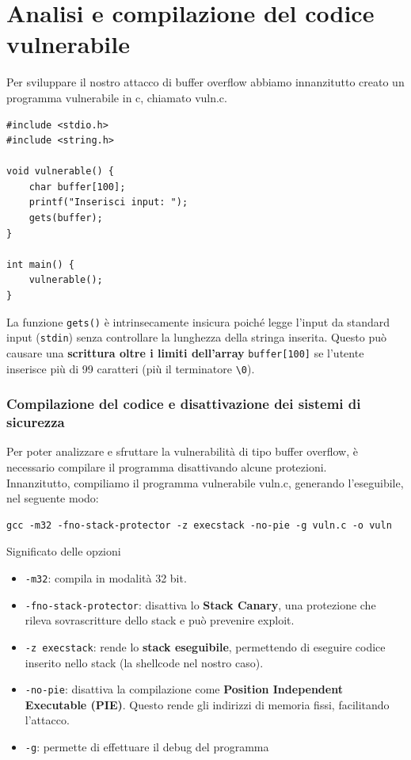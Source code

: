\documentclass[main.tex]{subfiles}
\begin{document}
\section{Analisi e compilazione del codice vulnerabile}\label{sec:cap 2}

Per sviluppare il nostro attacco di buffer overflow abbiamo innanzitutto creato un programma vulnerabile in c, chiamato vuln.c.\\

\begin{lstlisting}[style=codiceC]
#include <stdio.h>
#include <string.h>

void vulnerable() {
    char buffer[100];
    printf("Inserisci input: ");
    gets(buffer);  
}

int main() {
    vulnerable();
}
\end{lstlisting}

\noindent La funzione \texttt{gets()} è intrinsecamente insicura poiché legge l'input da standard input (\texttt{stdin}) senza controllare la lunghezza della stringa inserita. Questo può causare una \textbf{scrittura oltre i limiti dell'array} \texttt{buffer[100]} se l'utente inserisce più di 99 caratteri (più il terminatore \texttt{\textbackslash 0}).

\subsubsection*{Compilazione del codice e disattivazione dei sistemi di sicurezza}

Per poter analizzare e sfruttare la vulnerabilità di tipo buffer overflow, è necessario compilare il programma disattivando alcune protezioni.\\
Innanzitutto, compiliamo il programma vulnerabile vuln.c, generando l'eseguibile, nel seguente modo:
\begin{verbatim}
gcc -m32 -fno-stack-protector -z execstack -no-pie -g vuln.c -o vuln
\end{verbatim}

\noindent Significato delle opzioni

\begin{itemize}
    \item \verb|-m32|: compila in modalità 32 bit.
    \item \verb|-fno-stack-protector|: disattiva lo \textbf{Stack Canary}, una protezione che rileva sovrascritture dello stack e può prevenire exploit.
    \item \verb|-z execstack|: rende lo \textbf{stack eseguibile}, permettendo di eseguire codice inserito nello stack (la shellcode nel nostro caso).
    \item \verb|-no-pie|: disattiva la compilazione come \textbf{Position Independent Executable (PIE)}. Questo rende gli indirizzi di memoria fissi, facilitando l'attacco.
    \item \verb|-g|:  permette di effettuare il debug del programma

\end{itemize}
\end{document}
